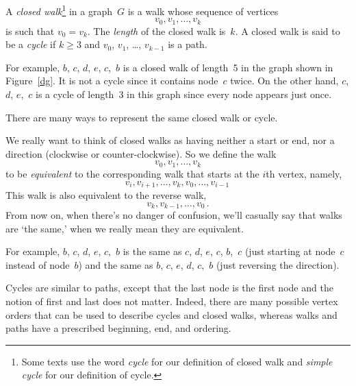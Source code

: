 \begin{definition}
A \emph{closed walk}\footnote{Some texts use the word \emph{cycle} for
  our definition of closed walk and \emph{simple cycle} for our
  definition of cycle.} in a graph~$G$ is a walk whose sequence of vertices
\begin{equation*}
    v_0, v_1, \dots, v_k
\end{equation*}
is such that $v_0=v_k$.  The \emph{length} of
the closed walk is~$k$.  A closed walk is said to be a \emph{cycle} if
$k \ge 3$ and $v_0$, $v_1$, \dots, $v_{k - 1}$ is a path.
\end{definition}

For example, $b$, $c$, $d$, $e$, $c$,~$b$ is a closed walk of
length~5 in the graph shown in Figure~\ref{dg}.  It is not a cycle
since it contains node~$c$ twice.  On the other hand, $c$, $d$,
$e$,~$c$ is a cycle of length~3 in this graph since every node
appears just once.

There are many ways to represent the same closed walk or cycle.

\begin{editingnotes}

We really want to think of closed walks as having neither a start or
end, nor a direction (clockwise or counter-clockwise).  So we define
the walk
\[
v_0, v_1, \dots, v_k
\]
to be \emph{equivalent} to the corresponding walk that starts at the $i$th vertex, namely,
\[
v_i, v_{i+1},\dots, v_k,v_0,\dots,v_{i-1}\,
\]
This walk is also equivalent to the reverse walk,
\[
v_k, v_{k-1},\dots, v_0\, .
\]
From now on, when there's no danger of confusion, we'll casually say
that walks are `the same,' when we really mean they are equivalent.
\end{editingnotes}
For example, $b$, $c$, $d$, $e$, $c$,~$b$ is the same as $c$, $d$,
$e$, $c$, $b$,~$c$ (just starting at node~$c$ instead of node~$b$) and
the same as $b$, $c$, $e$, $d$, $c$,~$b$ (just reversing the
direction).
\begin{editingnotes}
Cycles are similar to paths, except that the last node is the first
node and the notion of first and last does not matter.  Indeed, there
are many possible vertex orders that can be used to describe cycles
and closed walks, whereas walks and paths have a prescribed beginning,
end, and ordering.
\end{editingnotes}


